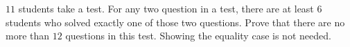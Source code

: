 $11$ students take a test. For any two question in a test, there are at least $6$ students who solved exactly one of
those two questions. Prove that there are no more than $12$ questions in this test. Showing the equality case is
not needed.
